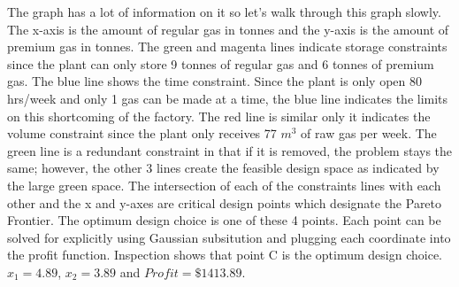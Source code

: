 \begin{enumerate}
  The graph has a lot of information on it so let's walk through this
  graph slowly. The x-axis is the amount of regular gas in tonnes and
  the y-axis is the amount of premium gas in tonnes. The green and
  magenta lines indicate storage constraints since the plant can only
  store 9 tonnes of regular gas and 6 tonnes of premium gas. The blue
  line shows the time constraint. Since the plant is only open 80
  hrs/week and only 1 gas can be made at a time, the blue line
  indicates the limits on this shortcoming of the factory. The red
  line is similar only it indicates the volume constraint since the
  plant only receives 77 $m^3$ of raw gas per week. The green line is
  a redundant constraint in that if it is removed, the problem stays
  the same; however, the other 3 lines create the feasible design
  space as indicated by the large green space. The intersection of
  each of the constraints lines with each other and the x and y-axes
  are critical design points which designate the Pareto Frontier. The
  optimum design choice is one of these 4 points. Each point can be
  solved for explicitly using Gaussian subsitution and plugging each
  coordinate into the profit function. Inspection shows that point C
  is the optimum design choice. $x_1 = 4.89$, $x_2 = 3.89$ and
  $Profit = \$1413.89$. 

\end{enumerate}

